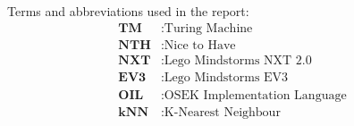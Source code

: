 
Terms and abbreviations used in the report:
\begin{align*}
	\textbf{TM} &: \text{Turing Machine} \\
    \textbf{NTH} &: \text{Nice to Have} \\
    \textbf{NXT} &: \text{Lego Mindstorms NXT 2.0} \\
    \textbf{EV3} &: \text{Lego Mindstorms EV3} \\  
    \textbf{OIL} &: \text{OSEK Implementation Language} \\
    \textbf{kNN} &: \text{K-Nearest Neighbour} \\
\end{align*}
